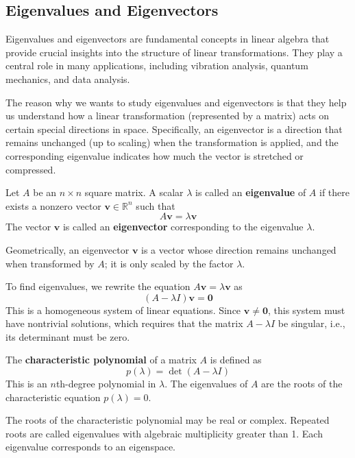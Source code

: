 \documentclass[oneside]{book}
\begin{document}
\subsection{Eigenvalues and Eigenvectors}

Eigenvalues and eigenvectors are fundamental concepts in linear algebra that provide crucial insights into the structure of linear transformations. They play a central role in many applications, including vibration analysis, quantum mechanics, and data analysis.

The reason why we wants to study eigenvalues and eigenvectors is that they help us understand how a linear transformation (represented by a matrix) acts on certain special directions in space. Specifically, an eigenvector is a direction that remains unchanged (up to scaling) when the transformation is applied, and the corresponding eigenvalue indicates how much the vector is stretched or compressed.

\begin{definition}
Let $A$ be an $n \times n$ square matrix. A scalar $\lambda$ is called an \textbf{eigenvalue} of $A$ if there exists a nonzero vector $\mathbf{v} \in \mathbb{R}^n$ such that
\[
A\mathbf{v} = \lambda \mathbf{v}
\]
The vector $\mathbf{v}$ is called an \textbf{eigenvector} corresponding to the eigenvalue $\lambda$.
\end{definition}

Geometrically, an eigenvector $\mathbf{v}$ is a vector whose direction remains unchanged when transformed by $A$; it is only scaled by the factor $\lambda$.

To find eigenvalues, we rewrite the equation $A\mathbf{v} = \lambda \mathbf{v}$ as
\[
(A - \lambda I)\mathbf{v} = \mathbf{0}
\]
This is a homogeneous system of linear equations. Since $\mathbf{v} \neq \mathbf{0}$, this system must have nontrivial solutions, which requires that the matrix $A - \lambda I$ be singular, i.e., its determinant must be zero.

\begin{definition}
The \textbf{characteristic polynomial} of a matrix $A$ is defined as
\[
p(\lambda) = \det(A - \lambda I)
\]
This is an $n$th-degree polynomial in $\lambda$. The eigenvalues of $A$ are the roots of the characteristic equation $p(\lambda) = 0$.
\end{definition}

The roots of the characteristic polynomial may be real or complex. Repeated roots are called eigenvalues with algebraic multiplicity greater than 1. Each eigenvalue corresponds to an eigenspace.
\end{document}
